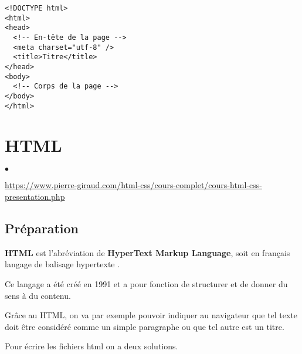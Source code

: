 \documentclass[10pt,dvipsnames, dvips, svgnames]{article}
\begin{document}
\begin{lstlisting}
<!DOCTYPE html>
<html>
<head>
  <!-- En-tête de la page -->
  <meta charset="utf-8" />
  <title>Titre</title>
</head>
<body>
  <!-- Corps de la page -->
</body>
</html>
\end{lstlisting}
\newpage


\section{HTML}

\begin{list}{$\bullet$}{}
\item \url{https://www.pierre-giraud.com/html-css/cours-complet/cours-html-css-presentation.php}
\end{list}

\subsection{Préparation}



\textbf{HTML} est l'abréviation de \textbf{HyperText Markup Language}, soit en français \og  langage de balisage hypertexte \fg.

Ce langage a été créé en 1991 et a pour fonction de structurer et de donner du sens à du contenu.

Grâce au HTML, on va par exemple pouvoir indiquer au navigateur que tel texte doit être considéré comme un simple paragraphe ou que tel autre est un titre.

Pour écrire les fichiers html on a deux solutions.
\end{document}
